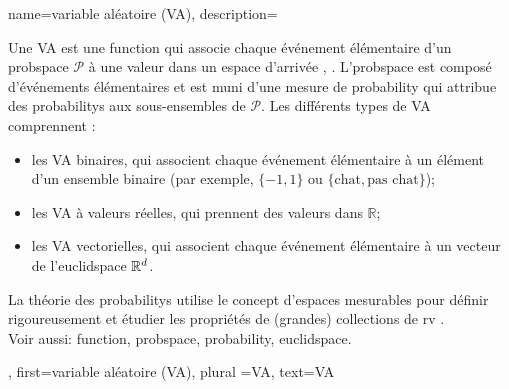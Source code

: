 {name={variable aléatoire (VA)},
	description={Une VA est une \gls{function} qui associe chaque événement élémentaire d’un \gls{probspace} $\mathcal{P}$ à une valeur dans un espace d’arrivée \cite{GrayProbBook}, \cite{BillingsleyProbMeasure}.  
		L'\gls{probspace} est composé d’événements élémentaires et est muni d’une mesure de \gls{probability} qui attribue des \glspl{probability} aux sous-ensembles de $\mathcal{P}$.  
		Les différents types de VA comprennent :  
		\begin{itemize} 
			\item les VA binaires, qui associent chaque événement élémentaire à un élément d’un ensemble binaire (par exemple, $\{-1,1\}$ ou $\{\text{chat}, \text{pas chat}\}$); 
			\item les VA à valeurs réelles, qui prennent des valeurs dans $\mathbb{R}$;  
			\item les VA vectorielles, qui associent chaque événement élémentaire à un vecteur de l’\gls{euclidspace} $\mathbb{R}^{d}$.  
		\end{itemize} 
		La théorie des \glspl{probability} utilise le concept d’espaces mesurables pour définir rigoureusement et étudier les propriétés de (grandes) collections de \gls{rv} \cite{BillingsleyProbMeasure}.
		\\ 
		Voir aussi: \gls{function}, \gls{probspace}, \gls{probability}, \gls{euclidspace}.},
	first={variable aléatoire (VA)}, plural ={VA}, text={VA}
}



